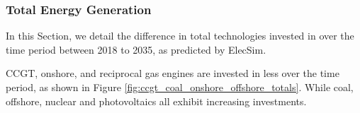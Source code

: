 \documentclass[final,3p,times,twocolumn,numbers]{elsarticle}
\begin{document}
%
%
%
%
%
%











\subsubsection{Total Energy Generation}



In this Section, we detail the difference in total technologies invested in over the time period between 2018 to 2035, as predicted by ElecSim.

CCGT, onshore, and reciprocal gas engines are invested in less over the time period, as shown in Figure \ref{fig:ccgt_coal_onshore_offshore_totals}. While coal, offshore, nuclear and photovoltaics all exhibit increasing investments.
\end{document}
